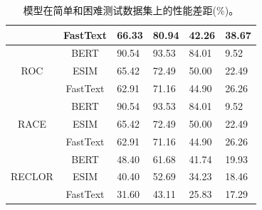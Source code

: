 \begin{table}[th]
\begin{tabular}{ccllll}
    \multicolumn{1}{c}{}                        & FastText                   & \multicolumn{1}{l}{66.33}    & 80.94                         & 42.26                         & 38.67                 \\ \midrule
    \multicolumn{1}{c}{\multirow{3}{*}{ROC}}    & BERT                       & \multicolumn{1}{l}{90.54}    & 93.53                         & 84.01                         & 9.52             \\
    \multicolumn{1}{c}{}                        & ESIM                       & \multicolumn{1}{l}{65.42}    & 72.49                         & 50.00                         & 22.49                  \\
    \multicolumn{1}{c}{}                        & FastText                   & \multicolumn{1}{l}{62.91}    & 71.16                         & 44.90                         & 26.26                 \\ \midrule
    \multicolumn{1}{c}{\multirow{3}{*}{RACE}}   & BERT                       & \multicolumn{1}{l}{90.54}    & 93.53                         & 84.01                         & 9.52                           \\
    \multicolumn{1}{c}{}                        & ESIM                       & \multicolumn{1}{l}{65.42}    & 72.49                         & 50.00                         & 22.49                       \\
    \multicolumn{1}{c}{}                        & FastText                   & \multicolumn{1}{l}{62.91}    & 71.16                         & 44.90                         & 26.26                        \\ \midrule
    \multicolumn{1}{c}{\multirow{3}{*}{RECLOR}} & BERT                       & \multicolumn{1}{l}{48.40}    & 61.68                         & 41.74          & 19.93         \\
    \multicolumn{1}{c}{}                        & ESIM                       & \multicolumn{1}{l}{40.40}    & 52.69                         & 34.23                         & 18.46                 \\
    \multicolumn{1}{c}{}                        & FastText                   & \multicolumn{1}{l}{31.60}    & 43.11                         & 25.83                         & 17.29                          \\ 
    \bottomrule
    \end{tabular}
    \caption{\label{tab4:gap_acc} 模型在简单和困难测试数据集上的性能差距(\%)。}
    \end{table}

